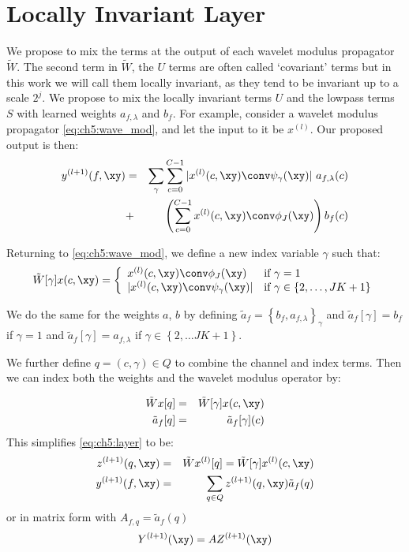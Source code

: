 \section{Locally Invariant Layer} \label{sec:ch5:method}
We propose to mix the terms at the output of each wavelet modulus propagator
$\tilde{W}$. The second term in $\tilde{W}$, the $U$ terms are often called `covariant' terms but
in this work we will call them locally invariant, as they tend to be invariant up to a
scale $2^j$. We propose to mix the locally invariant terms $U$ and the
lowpass terms $S$ with learned weights $a_{f,\lambda}$ and $b_f$. For example,
consider a wavelet modulus propagator \autoref{eq:ch5:wave_mod},
and let the input to it be $x^{(l)}$. Our proposed output is then:
%
\begin{eqnarray} \label{eq:ch5:comb1}
  y^{(l+1)}(f, \xy) & = & \sum_{\gamma} \sum_{c=0}^{C-1} |x^{(l)}(c, \xy)\conv \psi_\gamma(\xy)|\ a_{f, \lambda}(c) \nonumber \\
                    & + & \left(\sum_{c=0}^{C-1} x^{(l)}(c, \xy) \conv \phi_J(\xy)\right) b_f(c)
  \label{eq:ch5:layer}
\end{eqnarray}

Returning to \autoref{eq:ch5:wave_mod}, we define a new index variable $\gamma$
such that:
\begin{equation}\label{eq:ch5:gamma}
  \tilde{W}[\gamma]x(c, \xy)  = \left\{
	\begin{array}{ll}
		x^{(l)}(c, \xy) \conv \phi_J(\xy) & \mbox{if } \gamma = 1 \\
   |x^{(l)}(c, \xy)\conv \psi_\gamma(\xy)|  & \mbox{if } \gamma \in \left\{2, \ldots, JK +
    1\right\}
	\end{array}
\right.
\end{equation}

We do the same for the weights $a$, $b$ by defining $\tilde{a}_f = \left\{b_f,
a_{f, \lambda} \right\}_\gamma$ and $\tilde{a}_f[\gamma] = b_f$ if $\gamma = 1$
and $\tilde{a}_f[\gamma] = a_{f, \lambda}$ if $\gamma \in \left\{2, \ldots JK + 1\right\}$.

We further define $q = (c, \gamma) \in Q$ to combine the channel and index
terms. Then we can index both the weights and the wavelet modulus operator by:

\begin{eqnarray}
  \tilde{W}x[q] & = & \tilde{W}[\gamma]x(c, \xy) \\
  \tilde{a}_f[q] & = & \tilde{a}_f[\gamma](c)
\end{eqnarray}
This simplifies \autoref{eq:ch5:layer} to be:
%
\begin{eqnarray}
  z^{(l+1)}(q, \xy) & = & \tilde{W}x^{(l)}[q] = \tilde{W}[\gamma]x^{(l)}(c, \xy) \label{eq:ch5:covariant}\\
  y^{(l+1)}(f, \xy) & = & \sum_{q \in Q} z^{(l+1)}(q, \xy) \tilde{a}_f(q) \label{eq:ch5:mixing}
\end{eqnarray}
or in matrix form with $A_{f,q} = \tilde{a}_f(q)$
%
\begin{equation}
  Y^{(l+1)}(\xy)  =  A Z^{(l+1)}(\xy) \label{eq:ch5:matrix}
\end{equation}

